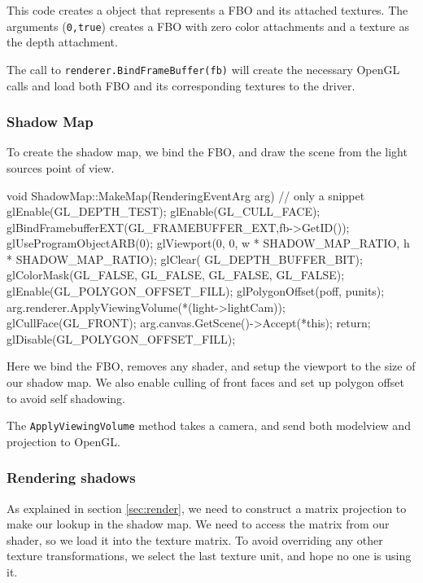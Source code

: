 This code creates a object that represents a FBO and its attached
textures. The arguments (\texttt{0,true}) creates a FBO with zero color
attachments and a texture as the depth attachment.

The call to \texttt{renderer.BindFrameBuffer(fb)} will create the
necessary OpenGL calls and load both FBO and its corresponding
textures to the driver.

\subsubsection*{Shadow Map}

To create the shadow map, we bind the FBO, and draw the scene from the
light sources point of view. 

\begin{cppcode}
void ShadowMap::MakeMap(RenderingEventArg arg) {
     // only a snippet
    glEnable(GL_DEPTH_TEST);
    glEnable(GL_CULL_FACE);
    glBindFramebufferEXT(GL_FRAMEBUFFER_EXT,fb->GetID());
    glUseProgramObjectARB(0);
    glViewport(0, 0,
               w * SHADOW_MAP_RATIO,
               h * SHADOW_MAP_RATIO);
    glClear( GL_DEPTH_BUFFER_BIT);
    glColorMask(GL_FALSE, GL_FALSE, GL_FALSE, GL_FALSE); 
    glEnable(GL_POLYGON_OFFSET_FILL);
    glPolygonOffset(poff, punits);
    arg.renderer.ApplyViewingVolume(*(light->lightCam));
    glCullFace(GL_FRONT);
    arg.canvas.GetScene()->Accept(*this); return;
    glDisable(GL_POLYGON_OFFSET_FILL);
}
\end{cppcode}

Here we bind the FBO, removes any shader, and setup the viewport to
the size of our shadow map. We also enable culling of front faces and
set up polygon offset to avoid self shadowing.

The \texttt{ApplyViewingVolume} method takes a camera, and send both
modelview and projection to OpenGL.


\subsubsection*{Rendering shadows}

As explained in section \ref{sec:render}, we need to construct a
matrix projection to make our lookup in the shadow map. We need to
access the matrix from our shader, so we load it into the texture
matrix. To avoid overriding any other texture transformations, we
select the last texture unit, and hope no one is using it.

